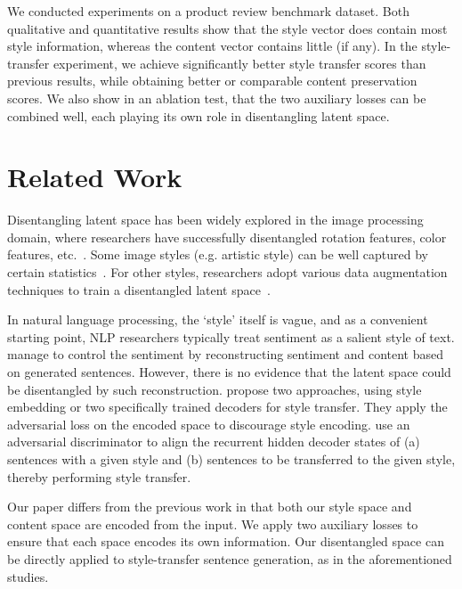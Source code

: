 \documentclass[11pt,a4paper]{article}
\begin{document}
We conducted experiments on a product review benchmark dataset. Both qualitative and quantitative results show that the style vector does contain most style information, whereas the content vector contains little (if any). In the style-transfer experiment, we achieve significantly better style transfer scores than previous results, while obtaining better or comparable content preservation scores.  We also show in an ablation test, that the two auxiliary losses can be combined well, each playing its own role in disentangling latent space.


\section{Related Work}


Disentangling latent space has been widely explored in the image processing domain, where researchers have successfully disentangled rotation features, color features, etc.~\cite{chen2016infogan,luan2017deep}. Some image styles (e.g. artistic style) can be well captured by certain statistics~\cite{gatys2016image}. For other styles, researchers adopt various data augmentation techniques to train a disentangled latent space~\cite{champandard2016semantic,kulkarni2015deep}.

In natural language processing, the `style' itself is vague, and as a convenient starting point, NLP researchers typically treat sentiment as a salient style of text.  manage to control the sentiment by reconstructing sentiment and content based on generated sentences. However, there is no evidence that the latent space could be disentangled by such reconstruction.  propose two approaches, using style embedding or two specifically trained decoders for style transfer. They apply the adversarial loss on the encoded space to discourage style encoding.  use an adversarial discriminator to align the recurrent hidden decoder states of (a) sentences with a given style and (b) sentences to be transferred to the given style, thereby performing style transfer.

Our paper differs from the previous work in that both our style space and content space are encoded from the input. We apply two auxiliary losses to ensure that each space encodes its own information. Our disentangled space can be directly applied to style-transfer sentence generation, as in the aforementioned studies.
\end{document}
